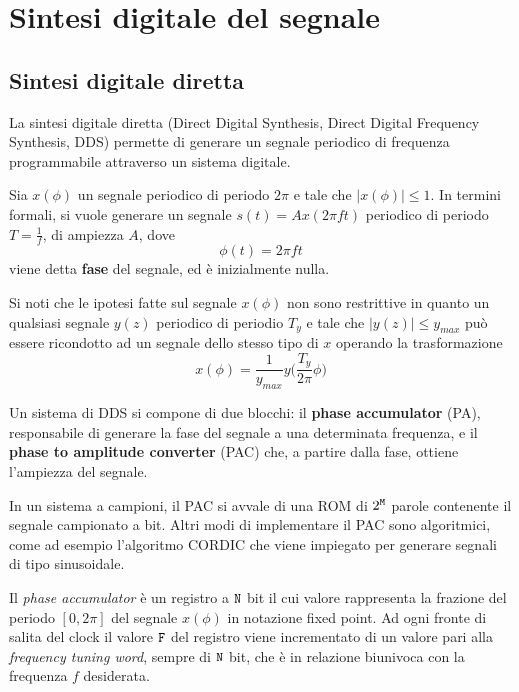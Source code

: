 \DeclarePairedDelimiter\floor{\Big \lfloor}{\Big \rfloor}

\chapter{Sintesi digitale del segnale}
\section{Sintesi digitale diretta}
La sintesi digitale diretta (Direct Digital Synthesis, Direct Digital Frequency Synthesis, DDS) permette di generare un segnale periodico di frequenza programmabile attraverso un sistema digitale.

Sia $x(\phi)$ un segnale periodico di periodo $2\pi$ e tale che $|x(\phi)| \le 1$.
In termini formali, si vuole generare un segnale $s(t)=Ax(2\pi ft)$ periodico di periodo $T=\frac{1}{f}$, di ampiezza $A$, dove
\begin{equation}
\label{eq:phase}
\phi(t) = 2\pi f t
\end{equation}
viene detta \textbf{fase} del segnale, ed è inizialmente nulla.

Si noti che le ipotesi fatte sul segnale $x(\phi)$ non sono restrittive in quanto
un qualsiasi segnale $y(z)$ periodico di periodio $T_y$ e tale che $|y(z)| \le y_{max}$ può
essere ricondotto ad un segnale dello stesso tipo di $x$ operando la trasformazione
\[
x(\phi)=\frac{1}{y_{max}}y \Big ( \frac{T_y}{2\pi}\phi \Big )
\]

Un sistema di DDS si compone di due blocchi: il \textbf{phase accumulator} (PA), responsabile di generare la fase del segnale a una determinata frequenza, e il \textbf{phase to amplitude converter} (PAC) che, a partire dalla fase, ottiene l'ampiezza del segnale.

In un sistema a campioni, il PAC si avvale di una ROM di $2^{\texttt{M}}$ parole contenente il segnale campionato a  bit.
Altri modi di implementare il PAC sono algoritmici, come ad esempio l'algoritmo CORDIC
che viene impiegato per generare segnali di tipo sinusoidale.

Il \textit{phase accumulator} è un registro a $\texttt{N}$ bit il cui valore rappresenta la frazione del periodo $[0, 2\pi]$ del segnale
$x(\phi)$ in notazione
fixed point. Ad ogni fronte di salita del clock il valore $\texttt{F}$ del registro viene incrementato di un valore pari alla \textit{frequency tuning word},
sempre di $\texttt{N}$ bit, che è in relazione biunivoca con la frequenza $f$ desiderata.

